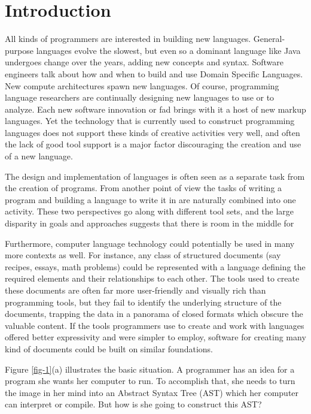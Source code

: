 \section{Introduction}


All kinds of programmers are interested in building new languages. General-purpose languages evolve the slowest, but even so a dominant language like Java undergoes change over the years, adding new concepts and syntax\cite{java-generics}. Software engineers talk about how and when to build and use Domain Specific Languages\cite{fowler}. New compute architectures spawn new languages\cite{cuda}\cite{opencl}. Of course, programming language researchers are continually designing new languages to use or to analyze. Each new software innovation or fad brings with it a host of new markup languages. Yet the technology that is currently used to construct programming languages does not support these kinds of creative activities very well, and often the lack of good tool support is a major factor discouraging the creation and use of a new language.

The design and implementation of languages is often seen as a separate task from the creation of programs\cite{ward}\cite{intentional}. From another point of view the tasks of writing a program and building a language to write it in are naturally combined into one activity\cite{on-lisp}. These two perspectives go along with different tool sets, and the large disparity in goals and approaches suggests that there is room in the middle for 

Furthermore, computer language technology could potentially be used in many more contexts as well. For instance, any class of structured documents (say recipes, essays, math problems) could be represented with a language defining the required elements and their relationships to each other. The tools used to create these documents are often far more user-friendly and visually rich than programming tools, but they fail to identify the underlying structure of the documents, trapping the data in a panorama of closed formats which obscure the valuable content. If the tools programmers use to create and work with languages offered better expressivity and were simpler to employ, software for creating many kind of documents could be built on similar foundations. 



Figure \ref{fig-1}(a) illustrates the basic situation. A programmer has an idea for a program she wants her computer to run. To accomplish that, she needs to turn the image in her mind into an Abstract Syntax Tree (AST) which her computer can interpret or compile. But how is she going to construct this AST?

